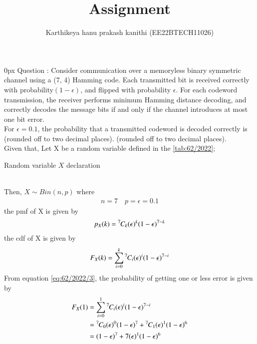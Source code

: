 \documentclass[article]{IEEEtran}
\theoremstyle{remark}
\begin{document}
\let\vec\mathbf


\title{
Assignment
}
\author{ Karthikeya hanu prakash kanithi (EE22BTECH11026)}
\maketitle
\parindent0px
\vspace{3cm}
Question : Consider communication over a memoryless binary symmetric channel using a
(7, 4) Hamming code. Each transmitted bit is received correctly with probability$(1 - \epsilon)$, and flipped with probability $\epsilon$. For each codeword transmission, the receiver
performs minimum Hamming distance decoding, and correctly decodes the message
bits if and only if the channel introduces at most one bit error.
\\For $\epsilon = 0.1$, the probability that a transmitted codeword is decoded correctly is
 \textunderscore\textunderscore\textunderscore\textunderscore\textunderscore\textunderscore (rounded off to two decimal places).
 (rounded off to two decimal places). 
\\ \solution 
Given that,
Let X be a random variable defined in the \autoref{tab:62/2022};
\begin{table}[h]
	\centering
	
	\caption{Random variable $X$ declaration}
        \label{tab:62/2022}
\end{table}
\\Then, $X \sim Bin(n,p)$ where 
\begin{align}
	n = 7 \quad p = \epsilon = 0.1 
	\label{eq:62/2022}
\end{align}
the pmf of X is given by
\begin{align}
    p_X(k) = {{}^{7}\mkern-1muC_{k}} (\epsilon)^k (1 - \epsilon)^{7-k}
    \label{eq:62/2022/2}
\end{align}
the cdf of X is given by
\begin{align}
    F_X(k) = \sum_{i=0}^{k} {{}^{7}\mkern-1muC_{i}} (\epsilon)^i (1 - \epsilon)^{7-i}
    \label{eq:62/2022/3}
\end{align}
From equation \eqref{eq:62/2022/3}, the probability of getting one or less error is given by 
\begin{align}
    F_X(1) &= \sum_{i=0}^{1} {{}^{7}\mkern-1muC_{i}} (\epsilon)^i (1-\epsilon)^{7-i}\\
    &= {{}^{7}\mkern-1muC_{0}} (\epsilon)^0 (1-\epsilon)^{7} + {{}^{7}\mkern-1muC_{1}} (\epsilon)^1 (1-\epsilon)^{6}\\
    &= (1-\epsilon)^{7}+7(\epsilon)^1(1-\epsilon)^{6} \label{eq:62/2022/4}
\end{align}
\end{document}

